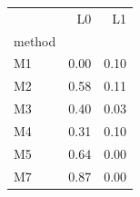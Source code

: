 \begin{tabular}{lrr}
\toprule
 & L0 & L1 \\
method &  &  \\
\midrule
M1 & 0.00 & 0.10 \\
M2 & 0.58 & 0.11 \\
M3 & 0.40 & 0.03 \\
M4 & 0.31 & 0.10 \\
M5 & 0.64 & 0.00 \\
M7 & 0.87 & 0.00 \\
\bottomrule
\end{tabular}
